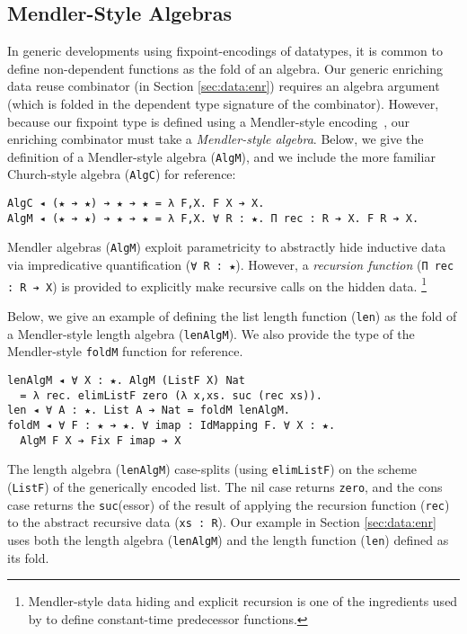 \documentclass[acmsmall]{acmart}\settopmatter{}
\newcommand{\refsec}[1]{Section \ref{sec:#1}}
\newcommand{\labsec}[1]{\label{sec:#1}}
\begin{document}
\subsection{Mendler-Style Algebras}
\labsec{data:mendler}

In generic developments using fixpoint-encodings of datatypes, it is
common to define non-dependent functions as the fold of an algebra.
Our generic enriching data reuse combinator (in \refsec{data:enr})
requires an algebra argument (which is folded in the dependent type signature of
the combinator). However, because our fixpoint type is defined
using a Mendler-style encoding~\cite{firsov18b}, our enriching combinator
must take a \textit{Mendler-style algebra}. Below, we give the definition of
a Mendler-style algebra (\verb;AlgM;), and we include the more familiar
Church-style algebra (\verb;AlgC;) for reference:
\begin{verbatim}
AlgC ◂ (★ ➔ ★) ➔ ★ ➔ ★ = λ F,X. F X ➔ X.
AlgM ◂ (★ ➔ ★) ➔ ★ ➔ ★ = λ F,X. ∀ R : ★. Π rec : R ➔ X. F R ➔ X.
\end{verbatim}
Mendler algebras (\verb;AlgM;) exploit parametricity to abstractly
hide inductive data via impredicative quantification
(\verb;∀ R : ★;). However, a \textit{recursion function}
(\verb;Π rec : R ➔ X;) is provided to explicitly make recursive calls
on the hidden data. \footnote{
  Mendler-style data hiding and explicit recursion is one of the
  ingredients used by \cite{firsov18b} to define constant-time
  predecessor functions.
}

Below, we give an example of defining the list length function
(\verb;len;) as the fold of a Mendler-style length algebra
(\verb;lenAlgM;). We also provide the type of the Mendler-style
\verb;foldM; function for reference.
\begin{verbatim}
lenAlgM ◂ ∀ X : ★. AlgM (ListF X) Nat
  = λ rec. elimListF zero (λ x,xs. suc (rec xs)).
len ◂ ∀ A : ★. List A ➔ Nat = foldM lenAlgM.
foldM ◂ ∀ F : ★ ➔ ★. ∀ imap : IdMapping F. ∀ X : ★. 
  AlgM F X ➔ Fix F imap ➔ X
\end{verbatim}
The length algebra (\verb;lenAlgM;) case-splits (using
\verb;elimListF;) on the scheme (\verb;ListF;) of the generically
encoded list. The nil case returns \verb;zero;, and the cons case
returns the \verb;suc;(essor) of the result of applying the recursion
function (\verb;rec;) to the abstract recursive data (\verb;xs : R;).
Our example in \refsec{data:enr} uses both the
length algebra (\verb;lenAlgM;) and the
length function (\verb;len;) defined as its fold.
\end{document}
